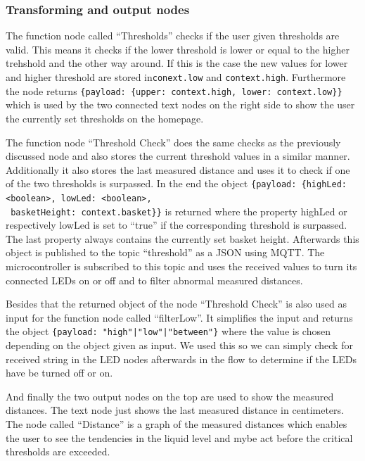 \documentclass{article}
\begin{document}
\subsubsection{Transforming and output nodes}
\label{sec:json}
The function node called \enquote{Thresholds} checks if the user given
thresholds are valid. This means it checks if the lower threshold is lower or
equal to the higher trehshold and the other way around. If this is the case the
new values for lower and higher threshold are stored in\verb|conext.low| and
\verb|context.high|. Furthermore the node returns
\verb|{payload: {upper: context.high, lower: context.low}}| which is used by the
two connected text nodes on the right side to show the user the currently set
thresholds on the homepage.\par
The function node \enquote{Threshold Check} does the same checks as the previously discussed node and also stores the current threshold values in a similar manner.  Additionally it also stores the last measured distance and uses it to check if one of the two thresholds is surpassed. In the end the object \verb|{payload: {highLed: <boolean>, lowLed: <boolean>,|\\
    \verb| basketHeight: context.basket}}| is returned where the property
highLed or respectively lowLed is set to \enquote{true} if the corresponding
threshold is surpassed. The last property always contains the currently set
basket height. Afterwards this object is published to the topic
\enquote{threshold} as a JSON using MQTT. The microcontroller is subscribed to
this topic and uses the received values to turn its connected LEDs on or off and
to filter abnormal measured distances.\par
Besides that the returned object of the node \enquote{Threshold Check} is also
used as input for the function node called \enquote{filterLow}. It simplifies
the input and returns the object \texttt{\{payload: "high"|"low"|"between"\}}
where the value is chosen depending on the object given as input. We used this
so we can simply check for received string in the LED nodes afterwards in the
flow to determine if the LEDs have be turned off or on.\par
And finally the two output nodes on the top are used to show the measured
distances. The text node just shows the last measured distance in centimeters.
The node called \enquote{Distance} is a graph of the measured distances which
enables the user to see the tendencies in the liquid level and mybe act before
the critical thresholds are exceeded.
\end{document}
